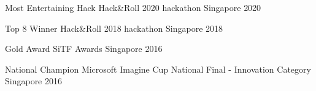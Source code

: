 



\begin{cvawards}

  \cvaward
    {Most Entertaining Hack} %
    {Hack\&Roll 2020 hackathon} %
    {Singapore} %
    {2020} %

  \cvaward
    {Top 8 Winner} %
    {Hack\&Roll 2018 hackathon} %
    {Singapore} %
    {2018} %

  \cvaward
    {Gold Award} %
    {SiTF Awards} %
    {Singapore} %
    {2016} %

  \cvaward
    {National Champion} %
    {Microsoft Imagine Cup National Final - Innovation Category} %
    {Singapore} %
    {2016} %

\end{cvawards}
